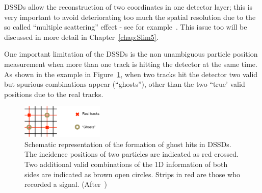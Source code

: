   DSSDs allow the reconstruction of two coordinates in one detector layer; 
 this is very important to avoid deteriorating too much the spatial resolution 
 due to the so called ``multiple scattering'' effect - see for example~\cite{pdg}. This issue too 
 will be discussed in more detail in Chapter~\ref{chap:Slim5}.

One important limitation of the DSSDs is the non unambiguous particle position measurement when 
more than one track is hitting the detector at the same time. As shown in the example 
in Figure~\ref{fig:ghosts}, when two tracks hit the detector two valid but spurious combinations 
appear (``ghosts''),  other than the two ``true' valid positions due to the real tracks.

  \begin{figure}[htbp]
   \centering
  \includegraphics[width=0.35\textwidth]{ghosts.pdf} 
      \caption{\label{fig:ghosts} Schematic representation of the formation of ghost hits in 
     DSSDs. The incidence positions of two particles are indicated as  red 
      crossed. Two additional valid combinations of the 1D information of both sides are indicated 
      as brown open circles. Strips in red are those who recorded a signal. (After~\cite{Krammer})}
\end{figure}


